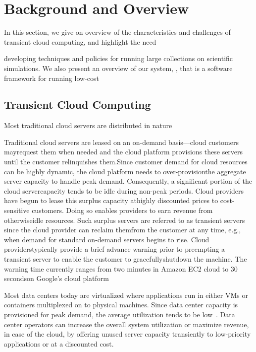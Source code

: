 \section{Background and Overview}

In this section, we give on overview of the characteristics and challenges of transient cloud computing, and highlight the need

developing techniques and policies for running large collections on scientific simulations.
We also present an overview of our system, \sysname, that is a software framework for running low-cost 

\subsection{Transient Cloud Computing}
Most traditional cloud servers are distributed in nature 

Traditional cloud servers are leased on an on-demand basis---cloud customers mayrequest them when needed and the cloud platform provisions these servers until the customer relinquishes them.Since customer demand for cloud resources can be highly dynamic, the cloud platform needs to over-provisionthe aggregate server capacity to handle peak demand. Consequently, a significant portion of the cloud servercapacity tends to be idle during non-peak periods. Cloud providers have begun to lease this surplus capacity athighly discounted prices to cost-sensitive customers. Doing so enables providers to earn revenue from otherwiseidle resources. Such surplus servers are referred to as transient servers since the cloud provider can reclaim themfrom the customer at any time, e.g., when demand for standard on-demand servers begins to rise. Cloud providerstypically provide a brief advance warning prior to preempting a transient server to enable the customer to gracefullyshutdown the machine. The warning time currently ranges from two minutes in Amazon EC2 cloud to 30 secondson Google’s cloud platform

Most data centers today are virtualized where applications run in either VMs or containers multiplexed on to physical machines. 
Since data center capacity is provisioned for peak demand, the average utilization tends to be low~\cite{borg,resource-central-sosp17}. 
Data center operators can increase the overall system utilization or maximize revenue, in case of the cloud, by offering unused server capacity transiently to low-priority
applications or at a discounted cost.

